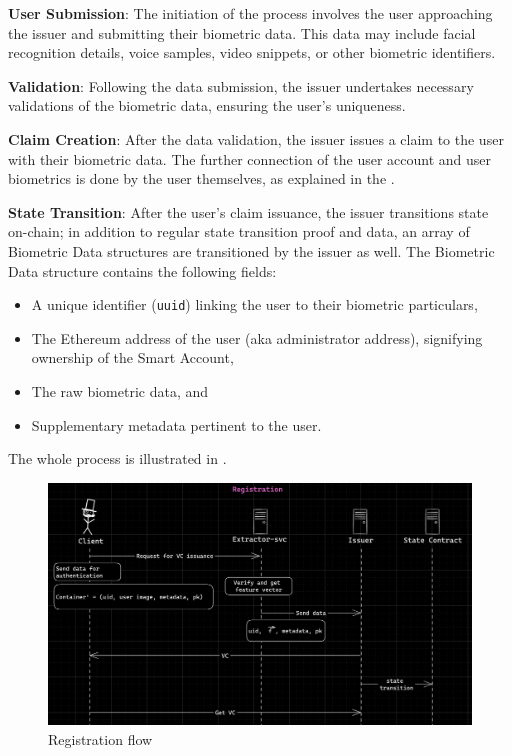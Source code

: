 \documentclass[a4, 14pt]{extarticle}
\begin{document}
\textbf{User Submission}: The initiation of the process involves the user approaching the issuer and submitting their biometric data. This data may include facial recognition details, voice samples, video snippets, or other biometric identifiers.

\textbf{Validation}: Following the data submission, the issuer undertakes necessary validations of the biometric data, ensuring the user's uniqueness.

\textbf{Claim Creation}: After the data validation, the issuer issues a claim to the user with their biometric data. The further connection of the user account and user biometrics is done by the user themselves, as explained in the .

\textbf{State Transition}: After the user's claim issuance, the issuer transitions state on-chain; in addition to regular state transition proof and data, an array of Biometric Data structures are transitioned by the issuer as well. The Biometric Data structure contains the following fields:

\begin{itemize}
    \item A unique identifier (\texttt{uuid}) linking the user to their biometric particulars,
    \item The Ethereum address of the user (aka administrator address), signifying ownership of the Smart Account,
    \item The raw biometric data, and
    \item Supplementary metadata pertinent to the user.
\end{itemize}

The whole process is illustrated in .

\begin{figure}
    \centering
    \includegraphics[width=\textwidth]{images/registration_flow-modified.png}
    \caption{Registration flow}
    \label{fig:registration}
\end{figure}
\end{document}
